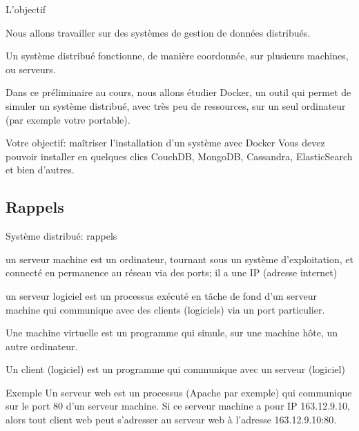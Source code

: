 
\begin{frame}{L'objectif}

Nous allons travailler sur des systèmes de gestion de données \alert{distribués}. 

\vfill

Un système distribué fonctionne, de manière coordonnée, 
sur plusieurs machines, ou \alert{serveurs}.

\vfill

Dans ce préliminaire au cours, nous allons étudier Docker, un outil qui permet de simuler un
système distribué, avec très peu de ressources, sur un seul ordinateur (par exemple votre portable).

\vfill

\begin{beamerboxesrounded}{Votre objectif: maîtriser l'installation d'un système avec Docker}
Vous devez pouvoir installer en quelques clics CouchDB, MongoDB, Cassandra,
ElasticSearch et bien d'autres. 
\end{beamerboxesrounded}

\end{frame}


\subsection{Rappels}



\begin{frame}{Système distribué: rappels}

\begin{redbullet}
  \item  un \alert{serveur machine} est un ordinateur, tournant sous un système d'exploitation,
    et connecté en permanence au réseau via des ports; il a une IP (adresse internet)
  \item   un \alert{serveur logiciel} est un processus exécuté en tâche de fond d'un serveur machine qui
    communique avec des \alert{clients (logiciels)} via un port particulier.
  \item Une \alert{machine virtuelle} est un programme qui simule, sur une machine hôte,
     un autre ordinateur.
   \item Un \alert{client} (logiciel) est un programme qui communique avec un serveur (logiciel)
\end{redbullet}
    
\begin{defblock}{Exemple}
Un serveur web est un processus (Apache par exemple) qui communique sur le
port 80 d'un serveur machine. Si ce serveur machine a pour IP 163.12.9.10, alors tout
client web peut s'adresser au serveur web à l'adresse 163.12.9.10:80.
\end{defblock}

\end{frame}


